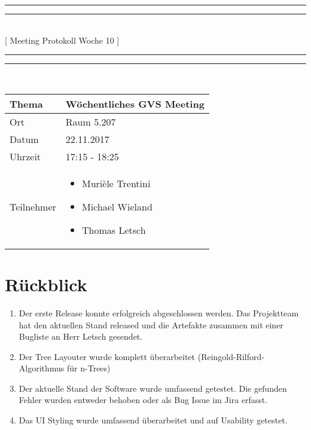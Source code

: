 \documentclass[11pt, a4paper,oneside]{scrartcl}
\begin{document}
	\centering
	\rule{\textwidth}{1.6pt}\vspace*{-\baselineskip}\vspace*{2pt} %
	\rule{\textwidth}{0.4pt}\\[\baselineskip] %
	{\LARGE [ Meeting Protokoll Woche 10 ]}\\[0.2\baselineskip] %
	\rule{\textwidth}{0.4pt}\vspace*{-\baselineskip}\vspace{3.2pt} %
	\rule{\textwidth}{1.6pt}\\[2\baselineskip] %
	
	\begin{tabu} to \linewidth {l X }
		\toprule
		\textbf{Thema} & \textbf{Wöchentliches GVS Meeting} \\
		\midrule
		Ort & Raum 5.207 \\
		Datum & 22.11.2017  \\
		Uhrzeit &  17:15 - 18:25 \\
		Teilnehmer & 
		\begin{minipage}[t]{\textwidth}
			\begin{itemize}
				\item Murièle Trentini
				\item Michael Wieland
				\item Thomas Letsch
			\end{itemize}
		\end{minipage}
		\\
		\bottomrule
	\end{tabu}
	
	
	\section{Rückblick}
	\begin{enumerate}
		\item Der erste Release konnte erfolgreich abgeschlossen werden. Das Projektteam hat den aktuellen Stand released und die Artefakte zusammen mit einer Bugliste an Herr Letsch gesendet.
		\item Der Tree Layouter wurde komplett überarbeitet (Reingold-Rilford-Algorithmus für n-Trees)
		\item Der aktuelle Stand der Software wurde umfassend getestet. Die gefunden Fehler wurden entweder behoben oder als Bug Issue im Jira erfasst.
		\item Das UI Styling wurde umfassend überarbeitet und auf Usability getestet.
	\end{enumerate}
	
\end{document}
